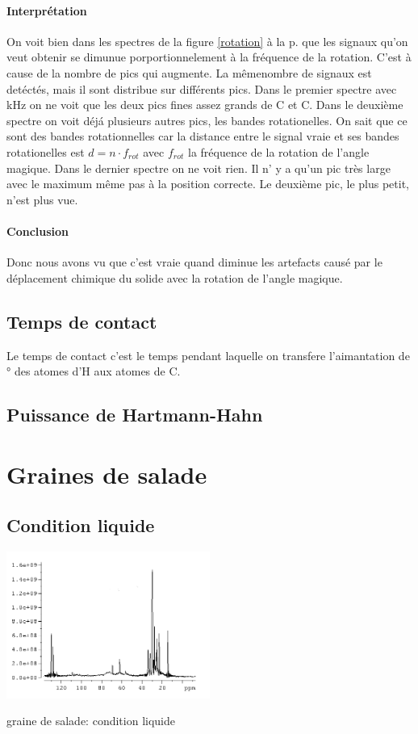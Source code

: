 \documentclass[a4paper,12pt]{scrartcl}
\begin{document}
   \paragraph{Interprétation}
    On voit bien dans les spectres de la figure \ref{rotation} à la p. \pageref{rotation} que les signaux qu'on veut obtenir se dimunue porportionnelement à la fréquence de la rotation. C'est à cause de la nombre de pics qui augmente. La mêmenombre de signaux est detéctés, mais il sont distribue sur différents pics. Dans le premier spectre avec \unit[4]{kHz} on ne voit que les deux pics fines assez grands de  C et C. Dans le deuxième spectre on voit déjá plusieurs autres pics, les bandes rotationelles. On sait que ce sont des bandes rotationnelles car la distance entre le signal vraie et ses bandes rotationelles est $d=n\cdot f_{rot}$ avec $f_{rot}$ la fréquence de la rotation de l'angle magique. Dans le dernier spectre on ne voit rien. Il n' y a qu'un pic très large avec le maximum même pas à la position correcte. Le deuxième pic, le plus petit, n'est plus vue.

   \paragraph{Conclusion}
    Donc nous avons vu que c'est vraie quand diminue les artefacts causé par le déplacement chimique du solide avec la rotation de l'angle magique. 

  \subsection{Temps de contact}
   Le temps de contact c'est le temps pendant laquelle on transfere l'aimantation de \unit[90]{\degree} des atomes d'H aux atomes de C.

  \subsection{Puissance de Hartmann-Hahn}
 
 

 \section{Graines de salade}
  \subsection{Condition liquide}
 \begin{figurehere}
    \center
    \includegraphics[width=0.5\textwidth]{bilder/graine_liquide.png}
    \caption{graine de salade: condition liquide}
   \end{figurehere}
\end{document}
